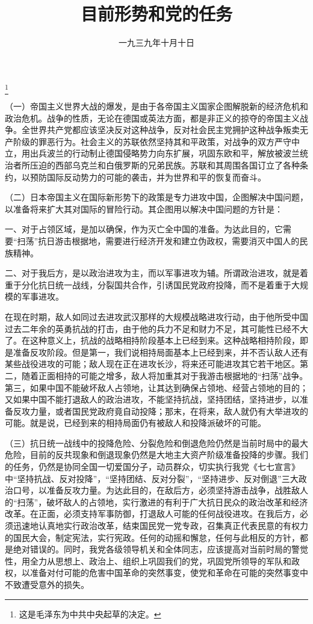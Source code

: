 
\title{目前形势和党的任务}
\date{一九三九年十月十日}
\thanks{这是毛泽东为中共中央起草的决定。}
\maketitle


（一）帝国主义世界大战的爆发，是由于各帝国主义国家企图解脱新的经济危机和政治危机。战争的性质，无论在德国或英法方面，都是非正义的掠夺的帝国主义战争。全世界共产党都应该坚决反对这种战争，反对社会民主党拥护这种战争叛卖无产阶级的罪恶行为。社会主义的苏联依然坚持其和平政策，对战争的双方严守中立，用出兵波兰的行动制止德国侵略势力向东扩展，巩固东欧和平，解放被波兰统治者所压迫的西部乌克兰和白俄罗斯的兄弟民族。苏联和其周围各国订立了各种条约，以预防国际反动势力的可能的袭击，并为世界和平的恢复而奋斗。

（二）日本帝国主义在国际新形势下的政策是专力进攻中国，企图解决中国问题，以准备将来扩大其对国际的冒险行动。其企图用以解决中国问题的方针是：

一、对于占领区域，是加以确保，作为灭亡全中国的准备。为达此目的，它需要“扫荡”抗日游击根据地，需要进行经济开发和建立伪政权，需要消灭中国人的民族精神。

二、对于我后方，是以政治进攻为主，而以军事进攻为辅。所谓政治进攻，就是着重于分化抗日统一战线，分裂国共合作，引诱国民党政府投降，而不是着重于大规模的军事进攻。

在现在时期，敌人如同过去进攻武汉那样的大规模战略进攻行动，由于他所受中国过去二年余的英勇抗战的打击，由于他的兵力不足和财力不足，其可能性已经不大了。在这种意义上，抗战的战略相持阶段基本上已经到来。这种战略相持阶段，即是准备反攻阶段。但是第一，我们说相持局面基本上已经到来，并不否认敌人还有某些战役进攻的可能；敌人现在正在进攻长沙，将来还可能进攻其它若干地区。第二，随着正面相持的可能之增多，敌人将加重其对于我游击根据地的“扫荡”战争。第三，如果中国不能破坏敌人占领地，让其达到确保占领地、经营占领地的目的；又如果中国不能打退敌人的政治进攻，不能坚持抗战，坚持团结，坚持进步，以准备反攻力量，或者国民党政府竟自动投降；那末，在将来，敌人就仍有大举进攻的可能。就是说，已经到来的相持局面仍有被敌人和投降派破坏的可能。

（三）抗日统一战线中的投降危险、分裂危险和倒退危险仍然是当前时局中的最大危险，目前的反共现象和倒退现象仍然是大地主大资产阶级准备投降的步骤。我们的任务，仍然是协同全国一切爱国分子，动员群众，切实执行我党《七七宣言》中“坚持抗战、反对投降”，“坚持团结、反对分裂”，“坚持进步、反对倒退”三大政治口号，以准备反攻力量。为达此目的，在敌后方，必须坚持游击战争，战胜敌人的“扫荡”，破坏敌人的占领地，实行激进的有利于广大抗日民众的政治改革和经济改革。在正面，必须支持军事防御，打退敌人可能的任何战役进攻。在我后方，必须迅速地认真地实行政治改革，结束国民党一党专政，召集真正代表民意的有权力的国民大会，制定宪法，实行宪政。任何的动摇和懈怠，任何与此相反的方针，都是绝对错误的。同时，我党各级领导机关和全体同志，应该提高对当前时局的警觉性，用全力从思想上、政治上、组织上巩固我们的党，巩固党所领导的军队和政权，以准备对付可能的危害中国革命的突然事变，使党和革命在可能的突然事变中不致遭受意外的损失。

